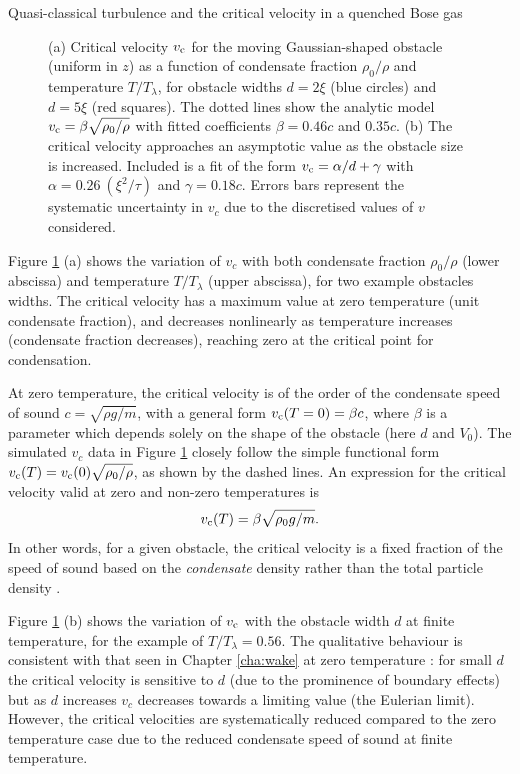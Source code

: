 \begin{chapter}{\label{cha:nonequib}Quasi-classical turbulence and the critical velocity in a quenched Bose gas}
\begin{figure}
\begin{center}
\end{center}
  \caption{\label{fig:vc-n0}(a) Critical velocity $v_{\rm c}$ for the moving Gaussian-shaped obstacle (uniform in $z$) as a function of condensate fraction $\rho_0/\rho$ and temperature $T/T_\lambda$, for obstacle widths $d=2\xi$ (blue circles) and $d=5\xi$ (red squares). The dotted lines show the analytic model $v_{\rm c}=\beta \sqrt{\rho_0/\rho}$ with fitted coefficients $\beta=0.46c$ and $0.35c$. (b) The critical velocity approaches an asymptotic value as the obstacle size is increased. Included is a fit of the form $v_{\rm c}=\alpha/d+\gamma$ with $\alpha=0.26~(\xi^2/\tau)$ and $\gamma=0.18 c$.  Errors bars represent the systematic uncertainty in $v_c$ due to the discretised values of $v$ considered.}
\end{figure}

Figure \ref{fig:vc-n0} (a) shows the variation of $v_c$ with both condensate fraction $\rho_0/\rho$ (lower abscissa) and temperature $T/T_\lambda$ (upper abscissa), for two example obstacles widths.  The critical velocity has a maximum value at zero temperature (unit condensate fraction), and decreases nonlinearly as temperature increases (condensate fraction decreases), reaching zero at the critical point for condensation.

At zero temperature, the critical velocity is of the order of the condensate speed of sound $c=\sqrt{\rho g/m}$, with a general form $v_{\rm c}(T=0)=\beta c$,
where $\beta$ is a parameter which depends solely on the shape of the
obstacle (here $d$ and $V_0$).  The simulated $v_c$ data in
Figure \ref{fig:vc-n0} closely follow the simple functional form
$v_{\rm c}(T) = v_{\rm c}(0) \sqrt{\rho_0/\rho}$, as shown by the dashed lines.
An expression for the critical velocity valid at zero and non-zero
temperatures is
\begin{equation}
v_{\rm c}(T)=\beta \sqrt{\rho_0 g/m}.
\label{eqn:finite_vc}
\end{equation}
In other words, for a given obstacle, the critical velocity is a fixed
fraction of the speed of sound based on the {\it condensate} density
rather than the total particle density \cite{leadbeater_2003}.

Figure \ref{fig:vc-n0} (b) shows the variation of $v_{\rm c}$ with the obstacle width $d$ at finite temperature, for the example of $T/T_\lambda =0.56$.   The qualitative behaviour is consistent with that seen in Chapter \ref{cha:wake} at zero temperature \cite{huepe00,rica2001,stagg_parker_14}: for small $d$ the critical velocity is sensitive to $d$ (due to the prominence of boundary effects) but as $d$ increases $v_c$ decreases towards a limiting value (the Eulerian limit).  However, the critical velocities are systematically reduced compared to the zero temperature case due to the reduced condensate speed of sound at finite temperature.



\end{chapter}
